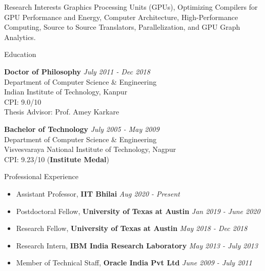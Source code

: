 \documentclass{resume} %
\begin{document}

\begin{rSection}{Research Interests}
	Graphics Processing Units (GPUs), Optimizing Compilers for GPU Performance and Energy, Computer Architecture, High-Performance Computing, Source to Source Translators, Parallelization, and  GPU Graph Analytics.
\end{rSection}


\begin{rSection}{Education}

{\bf Doctor of Philosophy} \hfill {\em July 2011 - Dec 2018} \\ 
Department of Computer Science \& Engineering \\
Indian Institute of Technology, Kanpur \\
CPI: 9.0/10 \\
Thesis Advisor: Prof. Amey Karkare

{\bf Bachelor of Technology} \hfill {\em July 2005 - May 2009}  \\
Department of Computer Science \& Engineering \\
Visvesvaraya National Institute of Technology, Nagpur \\
CPI: 9.23/10 (\textbf{Institute Medal})

\end{rSection}


\begin{rSection}{Professional Experience}
	\begin{itemize}
		\item Assistant Professor, \textbf{IIT Bhilai} \hfill {\em Aug 2020 - Present}
		\item Postdoctoral Fellow, \textbf{University of Texas at Austin}  \hfill {\em Jan 2019 - June 2020}
		\item Research Fellow, \textbf{University of Texas at Austin} \hfill{\em May 2018 - Dec 2018}
		\item Research Intern, \textbf{IBM India Research Laboratory} \hfill{\em May 2013 - July 2013}
		\item Member of Technical Staff, \textbf{Oracle India Pvt Ltd} \hfill{\em June 2009 - July 2011}
	\end{itemize}
\end{rSection}
\end{document}
